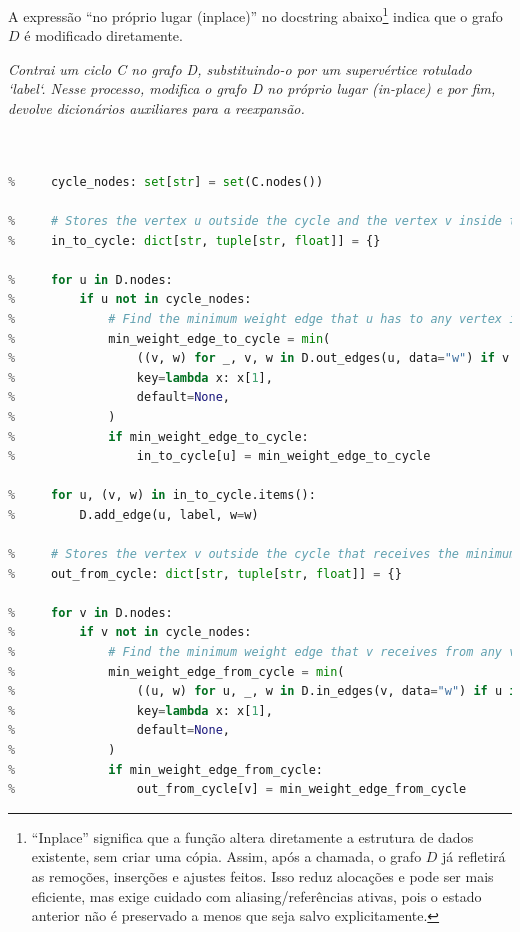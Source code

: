 \noindent A expressão “no próprio lugar (in\-place)” no docstring abaixo\footnote{“In\-place” significa que a função altera diretamente a estrutura de dados existente, sem criar uma cópia. Assim, após a chamada, o grafo \(D\) já refletirá as remoções, inserções e ajustes feitos. Isso reduz alocações e pode ser mais eficiente, mas exige cuidado com aliasing/referências ativas, pois o estado anterior não é preservado a menos que seja salvo explicitamente.} indica que o grafo \(D\) é modificado diretamente.

\begin{tcolorbox}[
        enhanced, breakable,
        colframe=blue!60!black, colback=blue!2,
        colbacktitle=blue!15, coltitle=black,
        title={Contração de ciclo},
        boxed title style={sharp corners, boxrule=0.6pt},
        sharp corners, boxrule=0.6pt
    ]
    \emph{Contrai um ciclo C no grafo D, substituindo-o por um supervértice rotulado `label`. Nesse processo, modifica o grafo D no próprio lugar (in-place) e por fim, devolve dicionários auxiliares para a reexpansão.}
    \tcblower
    \begin{lstlisting}[mathescape=true, language=Python]
% def contract_cycle(D: nx.DiGraph, C: nx.DiGraph, label: str):
    

%     cycle_nodes: set[str] = set(C.nodes())

%     # Stores the vertex u outside the cycle and the vertex v inside the cycle that receives the minimum weight edge
%     in_to_cycle: dict[str, tuple[str, float]] = {}

%     for u in D.nodes:
%         if u not in cycle_nodes:
%             # Find the minimum weight edge that u has to any vertex in C
%             min_weight_edge_to_cycle = min(
%                 ((v, w) for _, v, w in D.out_edges(u, data="w") if v in cycle_nodes),
%                 key=lambda x: x[1],
%                 default=None,
%             )
%             if min_weight_edge_to_cycle:
%                 in_to_cycle[u] = min_weight_edge_to_cycle

%     for u, (v, w) in in_to_cycle.items():
%         D.add_edge(u, label, w=w)

%     # Stores the vertex v outside the cycle that receives the minimum weight edge from a vertex u inside the cycle
%     out_from_cycle: dict[str, tuple[str, float]] = {}

%     for v in D.nodes:
%         if v not in cycle_nodes:
%             # Find the minimum weight edge that v receives from any vertex in C
%             min_weight_edge_from_cycle = min(
%                 ((u, w) for u, _, w in D.in_edges(v, data="w") if u in cycle_nodes),
%                 key=lambda x: x[1],
%                 default=None,
%             )
%             if min_weight_edge_from_cycle:
%                 out_from_cycle[v] = min_weight_edge_from_cycle


\end{lstlisting}
\end{tcolorbox}
